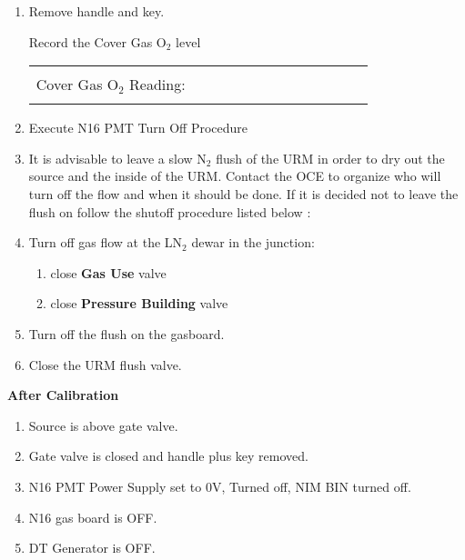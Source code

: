 \begin{enumerate}
\item \checkbox Remove handle and key.

 
 \checkitem Record the Cover Gas O$_2$ level
     \begin{center}
     \begin{tabular}{|l|}
     \hline
      \\
     Cover Gas O$_2$ Reading:~~~~~~~~~~~~~~~~~~~~~~~~\\
      \\
     \hline
     \end{tabular}
     \end{center}



\item\checkbox Execute N16 PMT Turn Off Procedure

\item  It is advisable to leave a slow N$_2$ flush of the URM in order to dry out
the source and the inside of the URM. Contact the OCE to organize who will turn
off the flow and when it should be done. If it is decided not to leave the
flush on follow the shutoff procedure listed below :



\item  Turn off gas flow at the LN$_2$ dewar in the junction:
   \begin{enumerate}
   \item \checkbox close {\bf Gas Use} valve
   \item \checkbox close {\bf Pressure Building} valve
   \end{enumerate}

\item \checkbox Turn off the flush on the gasboard.
\item \checkbox Close the URM flush valve.


\end{enumerate}

\begin{center}
                 {\bf After Calibration}
\end{center}

\begin{enumerate}

\item \checkbox Source is above gate valve.
\item \checkbox Gate valve is closed and handle plus key removed.
\item \checkbox N16 PMT Power Supply set to  0V, Turned off, NIM BIN turned off.
\item \checkbox N16 gas board is OFF.
\item \checkbox DT Generator is OFF.



\end{enumerate}








